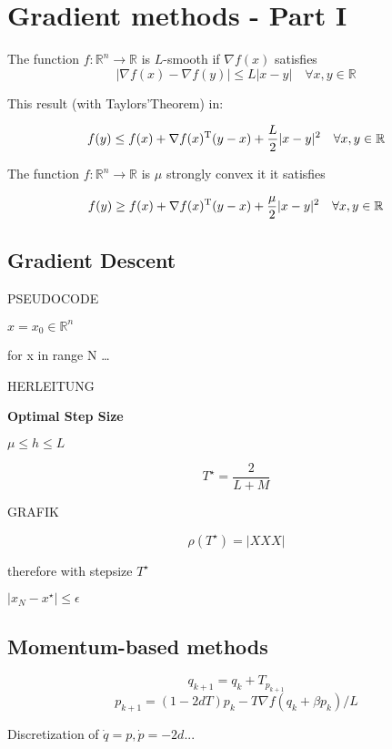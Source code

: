 \section{Gradient methods - Part I}

\begin{definition}[smoothness]
	The function $f : \mathbb{R}^{n}\rightarrow \mathbb{R}$ is $L$-smooth
	if $\nabla f(x)$ satisfies
	\[|\nabla f(x)-\nabla f(y)|\le L|x-y| \quad \forall x,y \in \mathbb{R}^{}\]
\end{definition}

This result (with Taylors'Theorem) in:


\[f(y)\le f(x)+\nabla f(x)^{\textnormal{\scriptsize T}}(y-x) +\frac{L}{2}|x-y|^2 \quad \forall x,y \in \mathbb{R}^{}\]


\begin{definition}
	The function $f : \mathbb{R}^{n}\rightarrow \mathbb{R}$ is $\mu$ strongly convex
	it it satisfies

	\[f(y)\ge f(x)+\nabla f(x)^{\textnormal{\scriptsize T}}(y-x) +\frac{\mu}{2}|x-y|^2 \quad \forall x,y \in \mathbb{R}^{}\]
\end{definition}

\subsection{Gradient Descent}

PSEUDOCODE

$x = x_0 \in \mathbb{R}^{n}$

for x in range N
\quad\dots

HERLEITUNG

\textbf{Optimal Step Size}

$\mu \le h \le L$

\[T^\star = \frac{2}{L+M}  \]

GRAFIK


$$\rho (T^\star) = |XXX|$$

therefore with stepsize $T^\star$

$|x_N - x^\star| \le \epsilon $

\subsection{Momentum-based methods}

$$ q_{k+1} = q_k + T_{p_{k+1}}$$
$$p_{k+1} = (1-2dT)p_k-T\nabla f(q_k + \beta p_k)/L$$

Discretization of $\dot{q}=p, \dot{p} = -2d ...$

